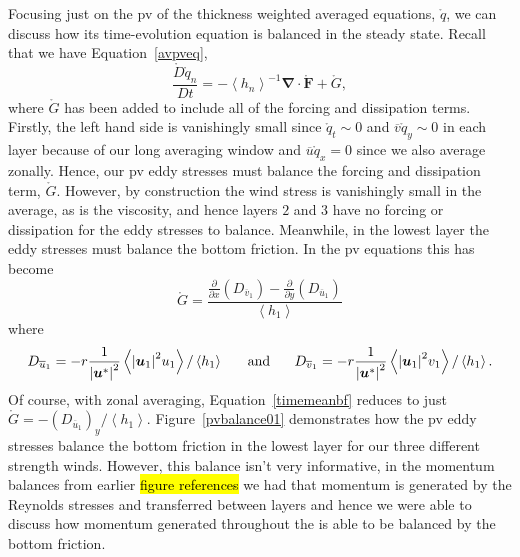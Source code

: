 \documentclass[12pt,a4paper]{report}
\newcommand*\thkmean[1]{\overline{#1}}
\newcommand*\nthkmean[1]{\left\langle{#1}\right\rangle}
\newcommand*\spec[1]{\mathring{#1}}
\newcommand*\figref[1]{Figure~\ref{#1}}
\newcommand*\equref[1]{Equation~\eqref{#1}}
\newcommand*{\partialdiff}[2][{}]{\frac{\partial #1}{\partial #2}}
\begin{document}
  Focusing just on the \gls{pv} of the thickness weighted averaged equations, $\spec{q}$, 
  we can discuss how its time-evolution equation is balanced in the steady state. 
  Recall that we have \equref{avpveq},
  \begin{equation*}
  \frac{\spec{D}\spec{q}_{n}}{D t} 
  =   -\nthkmean{h_{n}}^{-1}
  \boldsymbol{\nabla}
  \cdot\boldsymbol{\spec{F}} +\spec{G} ,
  \end{equation*} 
  where $\spec{G}$ has been added to include all of the forcing and dissipation terms.
  Firstly, the left hand side is vanishingly small since $\spec{q}_{t} \sim 0$ and
  $\thkmean{v}\spec{q}_{y}\sim 0$ in each layer because of our long averaging window
  and $\thkmean{u}\spec{q}_{x} = 0$ since we also average zonally. Hence, our \gls{pv}
  eddy stresses must balance the forcing and dissipation term, $\spec{G}$. 
  However, by construction the wind stress is vanishingly
  small in the average, as is the viscosity, and hence layers $2$ and $3$ have no
  forcing or dissipation for the eddy stresses to balance. Meanwhile, in the lowest layer
  the eddy stresses must balance the bottom friction. In the \gls{pv} equations this
  has become
  \begin{equation}
  \spec{G}=\frac{\partialdiff{x}\left(D_{\thkmean{v}_{1}}\right)-\partialdiff{y}\left(D_{\thkmean{u}_{1}}\right)}{\nthkmean{h_{1}}}
  \label{timemeanbf}
  \end{equation}
  where 
  \begin{equation*}
  D_{\thkmean{u}_{1}}=- r  \frac{ 1 }
  {\left|\boldsymbol{u}^{\ast}\right|^{2}}
  \nthkmean{ { \left|\boldsymbol{u}_{1}\right| }^{2}
  u_{1}}/\nthkmean{h_{1}} \mbox{\hspace{5mm} and \hspace{5mm}}
  D_{\thkmean{v}_{1}}=- r \frac{ 1 }
  {\left|\boldsymbol{u}^{\ast}\right|^{2}}
  \nthkmean{ { \left|\boldsymbol{u}_{1}\right| }^{2}
  	v_{1}}/\nthkmean{h_{1}}.
  \end{equation*} 
  Of course, with zonal averaging, \equref{timemeanbf} reduces to just  $\spec{G}=-\left(D_{\thkmean{u}_{1}}\right)_{y}/{\nthkmean{h_{1}}}$.
  \figref{pvbalance01} demonstrates how the \gls{pv} eddy stresses balance the 
  bottom friction in the lowest layer for our three different strength winds.
  However, this balance isn't very informative, in the momentum balances from 
  earlier \hl{figure references} we had that momentum is generated by the Reynolds 
  stresses and transferred between layers and hence we were able to discuss how
  momentum generated throughout the is able to be balanced by the bottom friction.
\end{document}
